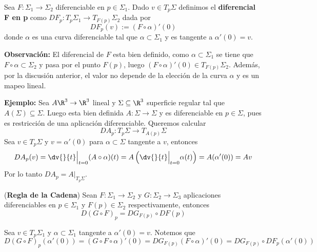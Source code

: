 \documentclass{article}
\begin{document}
\begin{dfn}
    Sea $F:\Sigma_{1}\to\Sigma_{2}$ diferenciable en $p\in\Sigma_{1}$. Dado $v\in T_{p}\Sigma$ 
    definimos el \textbf{diferencial F en p} como $DF_{p}:T_{p}\Sigma_{1}\to T_{F(p)}
    \Sigma_{2}$ dada por
    \begin{equation*}
        DF_{p}(v):=(F\circ\alpha)'(0)
    \end{equation*}
    donde $\alpha$ es una curva diferenciable tal que $\alpha\subset\Sigma_{1}$ y es tangente a 
    $\alpha'(0)=v$.
\end{dfn}

\noindent\textbf{Observación:} El diferencial de $F$ esta bien definido, como $\alpha\subset
\Sigma_{1}$ se tiene que $F\circ\alpha\subset\Sigma_{2}$ y pasa por el punto $F(p)$, luego 
$(F\circ\alpha)'(0)\in T_{F(p)}\Sigma_{2}$. Además, por la discusión anterior, el valor no depende
de la elección de la curva $\alpha$ y es un mapeo lineal.

\vspace{2mm}
\noindent\textbf{Ejemplo:} Sea $A\R^{3}\to\R^{3}$ lineal y $\Sigma\subseteq\R^{3}$ superficie 
regular tal que $A(\Sigma)\subseteq\Sigma$. Luego esta bien definida $A:\Sigma\to\Sigma$ y es 
diferenciable en $p\in\Sigma$, pues es restricción de una aplicación diferenciable. Queremos 
calcular
\begin{equation*}
    DA_{p}:T_{p}\Sigma\to T_{A(p)}\Sigma
\end{equation*}
Sea $v\in T_{p}\Sigma$ y $v=\alpha'(0)$ para $\alpha\subset\Sigma$ tangente a $v$, entonces
\begin{equation*}
    DA_{p}(v)=\dv{}{t}\Big|_{t=0}(A\circ\alpha)(t)=A\left(\dv{}{t}\Big|_{t=0}\alpha(t)\right)=
    A(\alpha'(0))=Av
\end{equation*}
Por lo tanto $DA_{p}=A\Big|_{T_{p}\Sigma}$.

\begin{teo}
    (\textbf{Regla de la Cadena}) Sean $F:\Sigma_{1}\to\Sigma_{2}$ y $G:\Sigma_{2}\to\Sigma_{3}$ 
    aplicaciones diferenciables en $p\in\Sigma_{1}$ y $F(p)\in\Sigma_{2}$ respectivamente, 
    entonces
    \begin{equation*}
        D(G\circ F)_{p}=DG_{F(p)}\circ DF(p)
    \end{equation*}
\end{teo}

\begin{dem}
    Sea $v\in T_{p}\Sigma_{1}$ y $\alpha\subset\Sigma_{1}$ tangente a $\alpha'(0)=v$. Notemos que
    \begin{equation*}
        D(G\circ F)_{p}(\alpha'(0))=(G\circ F\circ \alpha)'(0)=DG_{F(p)}(F\circ\alpha)'(0)=
        DG_{F(p)}\circ DF_{p}(\alpha'(0))
    \end{equation*}
\end{dem}
\end{document}
